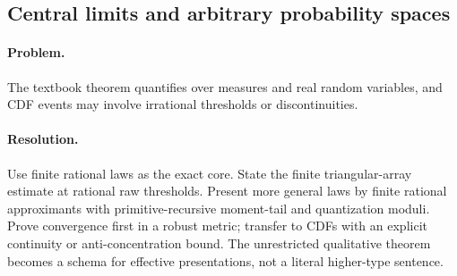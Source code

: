 \subsection{Central limits and arbitrary probability spaces}

\paragraph{Problem.}
The textbook theorem quantifies over measures and real random variables, and
CDF events may involve irrational thresholds or discontinuities.

\paragraph{Resolution.}
Use finite rational laws as the exact core.  State the finite triangular-array
estimate at rational raw thresholds.  Present more general laws by finite
rational approximants with primitive-recursive moment-tail and quantization
moduli.  Prove convergence first in a robust metric; transfer to CDFs with an
explicit continuity or anti-concentration bound.  The unrestricted qualitative
theorem becomes a schema for effective presentations, not a literal
higher-type sentence.
